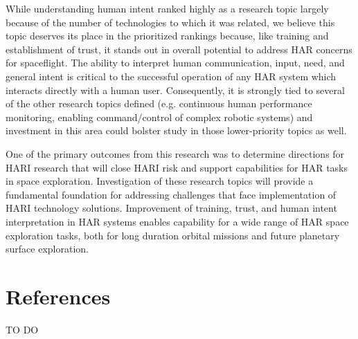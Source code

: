 While understanding human intent ranked highly as a research topic largely because of the number of technologies to which it was related, we believe this topic deserves its place in the prioritized rankings because, like training and establishment of trust, it stands out in overall potential to address HAR concerns for spaceflight.
The ability to interpret human communication, input, need, and general intent is critical to the successful operation of any HAR system which interacts directly with a human user.
Consequently, it is strongly tied to several of the other research topics defined (e.g. continuous human performance monitoring, enabling command/control of complex robotic systems) and investment in this area could bolster study in those lower-priority topics as well.

One of the primary outcomes from this research was to determine directions for HARI research that will close HARI risk and support capabilities for HAR tasks in space exploration.
Investigation of these research topics will provide a fundamental foundation for addressing challenges that face implementation of HARI technology solutions.
Improvement of training, trust, and human intent interpretation in HAR systems enables capability for a wide range of HAR space exploration tasks, both for long duration orbital missions and future planetary surface exploration.

\section{References}
TO DO

